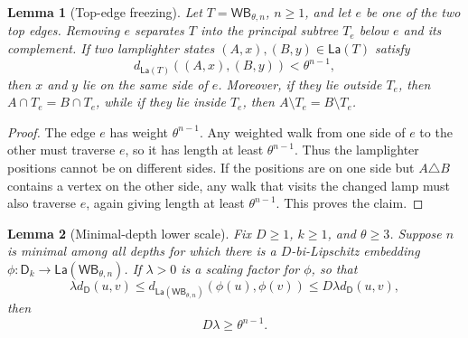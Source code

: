 \documentclass[11pt]{article}
\newtheorem{lemma}{Lemma}
\newcommand{\D}{\mathsf D}
\newcommand{\Lam}{\mathsf{La}}
\newcommand{\WB}{\mathsf{WB}}
\newcommand{\symdiff}{\triangle}
\begin{document}
\begin{lemma}[Top-edge freezing]
\label{lem:freezing}
Let \(T=\WB_{\theta,n}\), \(n\geq 1\), and let \(e\) be one of the two top
edges. Removing \(e\) separates \(T\) into the principal subtree \(T_e\) below
\(e\) and its complement. If two lamplighter states
\((A,x),(B,y)\in\Lam(T)\) satisfy
\[
  d_{\Lam(T)}((A,x),(B,y)) < \theta^{n-1},
\]
then \(x\) and \(y\) lie on the same side of \(e\). Moreover, if they lie
outside \(T_e\), then \(A\cap T_e=B\cap T_e\), while if they lie inside
\(T_e\), then \(A\setminus T_e=B\setminus T_e\).
\end{lemma}

\begin{proof}
The edge \(e\) has weight \(\theta^{n-1}\). Any weighted walk from one side of
\(e\) to the other must traverse \(e\), so it has length at least
\(\theta^{n-1}\). Thus the lamplighter positions cannot be on different sides.
If the positions are on one side but \(A\symdiff B\) contains a vertex on the
other side, any walk that visits the changed lamp must also traverse \(e\),
again giving length at least \(\theta^{n-1}\). This proves the claim.
\end{proof}

\begin{lemma}[Minimal-depth lower scale]
\label{lem:minimal-depth}
Fix \(D\geq 1\), \(k\geq 1\), and \(\theta\geq 3\). Suppose \(n\) is minimal
among all depths for which there is a \(D\)-bi-Lipschitz embedding
\(\phi:\D_k\to \Lam(\WB_{\theta,n})\). If \(\lambda>0\) is a scaling factor for
\(\phi\), so that
\[
  \lambda d_{\D}(u,v)
  \leq d_{\Lam(\WB_{\theta,n})}(\phi(u),\phi(v))
  \leq D\lambda d_{\D}(u,v),
\]
then
\[
  D\lambda \geq \theta^{n-1}.
\]
\end{lemma}
\end{document}
